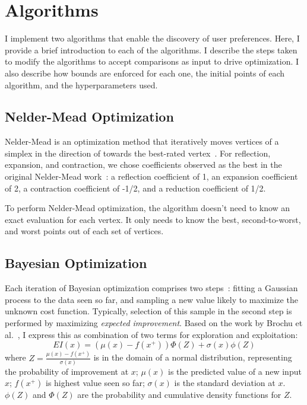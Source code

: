 \section{Algorithms}

I implement two algorithms that enable the discovery of user preferences.
Here, I provide a brief introduction to each of the algorithms.
I describe the steps taken to modify the algorithms to accept comparisons as input to drive optimization.
I also describe how bounds are enforced for each one, the initial points of each algorithm, and the hyperparameters used.

\subsection{Nelder-Mead Optimization}

Nelder-Mead is an optimization method that iteratively moves vertices of a simplex in the direction of towards the best-rated vertex~\cite{nelder_simplex_1965}.
For reflection, expansion, and contraction, we chose coefficients observed as the best in the original Nelder-Mead work~\cite{nelder_simplex_1965}:
a reflection coefficient of 1,
an expansion coefficient of 2,
a contraction coefficient of -1/2,
and a reduction coefficient of 1/2.

To perform Nelder-Mead optimization, the algorithm doesn't need to know an exact evaluation for each vertex.
It only needs to know the best, second-to-worst, and worst points out of each set of vertices.

\subsection{Bayesian Optimization}

Each iteration of Bayesian optimization comprises two steps~\cite{brochu_tutorial_2010}:
fitting a Gaussian process to the data seen so far, and sampling a new value likely to maximize the unknown cost function.
Typically, selection of this sample in the second step is performed by maximizing \emph{expected improvement}.
Based on the work by Brochu et al.~\cite{brochu_tutorial_2010}, I express this as combination of two terms for exploration and exploitation:
\begin{equation}
EI (x) = (\mu(x) - f (x^+)) \Phi(Z) + \sigma(x) \phi(Z)
\end{equation}
where $Z = \frac{\mu(x) - f(x^+)}{\sigma(x)}$ is in the domain of a normal distribution, representing the probability of improvement at $x$;
$\mu(x)$ is the predicted value of a new input $x$;
$f(x^+)$ is highest value seen so far;
$\sigma(x)$ is the standard deviation at $x$.
$\phi(Z)$ and $\Phi(Z)$ are the probability and cumulative density functions for $Z$.

